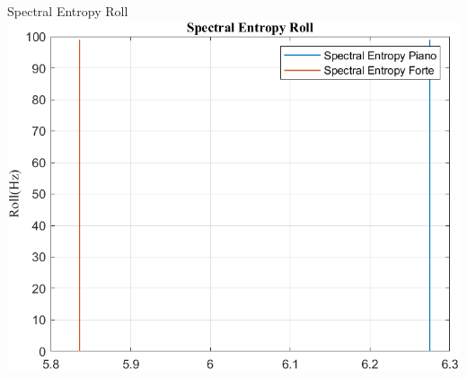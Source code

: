 \documentclass[beamer]{standalone}
\begin{document}
%	
%	
%	
%	
	
	\begin{frame}{{Spectral Entropy Roll}}
		\centering\includegraphics[height=.8\textheight]{figure/VAng/Trasformata/Spectral EntropyRoll}
	\end{frame}
	
\end{document}
